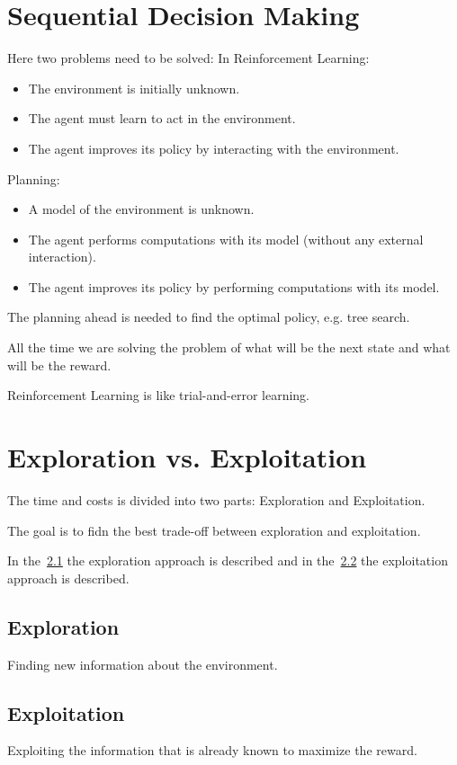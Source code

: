 \section{Sequential Decision Making}
Here two problems need to be solved:
In Reinforcement Learning:
\begin{itemize}
    \item The environment is initially unknown.
    \item The agent must learn to act in the environment.
    \item The agent improves its policy by interacting with the environment.
\end{itemize}

Planning:
\begin{itemize}
    \item A model of the environment is unknown.
    \item The agent performs computations with its model (without any external interaction).
    \item The agent improves its policy by performing computations with its model.
\end{itemize}

The planning ahead is needed to find the optimal policy, e.g. tree search.

All the time we are solving the problem of what will be the next state and what will be the reward.

Reinforcement Learning is like trial-and-error learning.


\section{Exploration vs. Exploitation}\label{sec:exploration-vs.-exploitation}
The time and costs is divided into two parts: Exploration and Exploitation.

The goal is to fidn the best trade-off between exploration and exploitation.

In the~\ref{subsec:exploration} the exploration approach is described and
in the~\ref{subsec:exploitation} the exploitation approach is described.

\subsection{Exploration}\label{subsec:exploration}
Finding new information about the environment.

\subsection{Exploitation}\label{subsec:exploitation}
Exploiting the information that is already known to maximize the reward.



